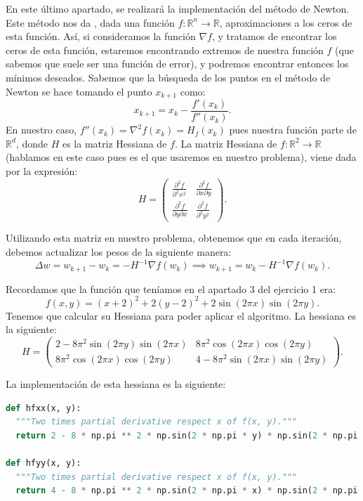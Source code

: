 \documentclass[12pt]{scrartcl}
\begin{document}
{En este último apartado, se realizará la implementación del método de Newton. Este método nos da , dada una función $f: \mathbb R^n \to \mathbb R$, aproximaciones a los ceros de esta función. Así, si consideramos la función $\nabla f$, y tratamos de encontrar
los ceros de esta función, estaremos encontrando extremos de nuestra función $f$ (que sabemos que suele ser una función de error), y podremos encontrar entonces los mínimos deseados. Sabemos que la búsqueda de los puntos en el método de Newton se hace tomando el punto $x_{k+1}$ como:
$$
x_{k+1} = x_k - \frac{f'(x_k)}{f''(x_k)}.
$$
En nuestro caso, $f''(x_k) = \nabla^2 f(x_k) = H_f(x_k)$ pues nuestra función parte de $\mathbb R^d$, donde $H$ es la matriz Hessiana de $f$. La matriz Hessiana de $f: \mathbb R^2 \to \mathbb R$ (hablamos en este caso pues es el que usaremos en nuestro problema), viene dada por la expresión:
$$
H = \begin{pmatrix}
  \frac{\partial^2 f}{\partial^2 x^2} & \frac{\partial^2 f}{\partial x \partial y}\\
  \frac{\partial^2 f}{\partial y \partial x} & \frac{\partial^2 f}{\partial^2 y^2}
  \end{pmatrix}.
$$

Utilizando esta matriz en nuestro problema, obtenemos que en cada iteración, debemos actualizar los pesos de la siguiente manera:
$$
\Delta w = w_{k+1} - w_{k} = - H^{-1}\nabla f(w_k) \implies w_{k+1} = w_k - H^{-1}\nabla f(w_k).
$$

Recordamos que la función que teníamos en el apartado 3 del ejercicio 1 era:
$$
f(x,y) = (x+2)^2 + 2(y-2)^2 + 2\sin(2\pi x) \sin(2\pi y).
$$
Tenemos que calcular su Hessiana para poder aplicar el algoritmo. La hessiana es la siguiente:
$$
H = \begin{pmatrix} 2- 8 \pi^2 \sin(2 \pi y) \sin(2 \pi x) & 8 \pi^2 \cos(2 \pi x) \cos(2 \pi y) \\
     8 \pi^2 \cos(2 \pi x) \cos(2 \pi y) & 4- 8 \pi^2 \sin(2 \pi x) \sin(2 \pi y) 
    \end{pmatrix}.
$$

La implementación de esta hessiana es la siguiente:

\begin{lstlisting}[language=Python]
def hfxx(x, y):
  """Two times partial derivative respect x of f(x, y)."""
  return 2 - 8 * np.pi ** 2 * np.sin(2 * np.pi * y) * np.sin(2 * np.pi * x)

def hfyy(x, y):
  """Two times partial derivative respect x of f(x, y)."""
  return 4 - 8 * np.pi ** 2 * np.sin(2 * np.pi * x) * np.sin(2 * np.pi * y)


\end{lstlisting}}
\end{document}
